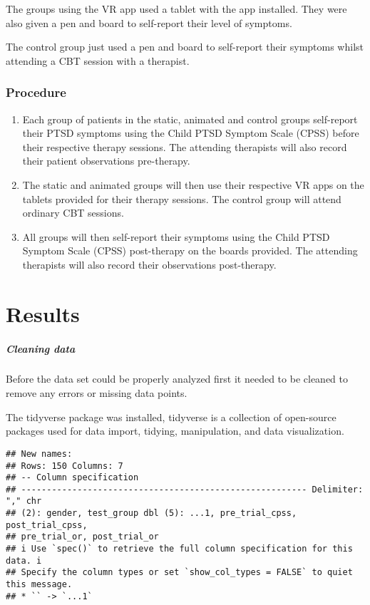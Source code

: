 \documentclass[
]{article}
\begin{document}
The groups using the VR app used a tablet with the app installed. They
were also given a pen and board to self-report their level of symptoms.

The control group just used a pen and board to self-report their
symptoms whilst attending a CBT session with a therapist.

\hypertarget{procedure}{%
\subsubsection{\texorpdfstring{\textbf{Procedure}}{Procedure}}\label{procedure}}

\begin{enumerate}
\def\labelenumi{\arabic{enumi}.}
\item
  Each group of patients in the static, animated and control groups
  self-report their PTSD symptoms using the Child PTSD Symptom Scale
  (CPSS) before their respective therapy sessions. The attending
  therapists will also record their patient observations pre-therapy.
\item
  The static and animated groups will then use their respective VR apps
  on the tablets provided for their therapy sessions. The control group
  will attend ordinary CBT sessions.
\item
  All groups will then self-report their symptoms using the Child PTSD
  Symptom Scale (CPSS) post-therapy on the boards provided. The
  attending therapists will also record their observations post-therapy.
\end{enumerate}

\hypertarget{results-1}{%
\section{Results}\label{results-1}}

\hypertarget{cleaning-data}{%
\subparagraph{\texorpdfstring{\emph{Cleaning
data}}{Cleaning data}}\label{cleaning-data}}

Before the data set could be properly analyzed first it needed to be
cleaned to remove any errors or missing data points.

The tidyverse package was installed, tidyverse is a collection of
open-source packages used for data import, tidying, manipulation, and
data visualization.

\begin{verbatim}
## New names:
## Rows: 150 Columns: 7
## -- Column specification
## -------------------------------------------------------- Delimiter: "," chr
## (2): gender, test_group dbl (5): ...1, pre_trial_cpss, post_trial_cpss,
## pre_trial_or, post_trial_or
## i Use `spec()` to retrieve the full column specification for this data. i
## Specify the column types or set `show_col_types = FALSE` to quiet this message.
## * `` -> `...1`
\end{verbatim}
\end{document}
